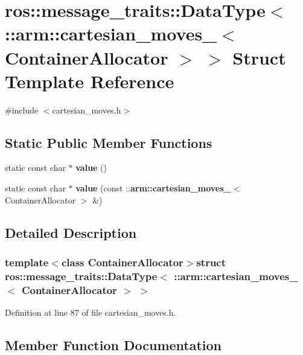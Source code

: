 \section{ros\-:\-:message\-\_\-traits\-:\-:\-Data\-Type$<$ \-:\-:arm\-:\-:cartesian\-\_\-moves\-\_\-$<$ \-Container\-Allocator $>$ $>$ \-Struct \-Template \-Reference}
\label{structros_1_1message__traits_1_1DataType_3_01_1_1arm_1_1cartesian__moves___3_01ContainerAllocator_01_4_01_4}


{\ttfamily \#include $<$cartesian\-\_\-moves.\-h$>$}

\subsection*{\-Static \-Public \-Member \-Functions}
\begin{DoxyCompactItemize}
\item 
static const char $\ast$ {\bf value} ()
\item 
static const char $\ast$ {\bf value} (const \-::{\bf arm\-::cartesian\-\_\-moves\-\_\-}$<$ \-Container\-Allocator $>$ \&)
\end{DoxyCompactItemize}


\subsection{\-Detailed \-Description}
\subsubsection*{template$<$class Container\-Allocator$>$struct ros\-::message\-\_\-traits\-::\-Data\-Type$<$ \-::arm\-::cartesian\-\_\-moves\-\_\-$<$ Container\-Allocator $>$ $>$}



\-Definition at line 87 of file cartesian\-\_\-moves.\-h.



\subsection{\-Member \-Function \-Documentation}

